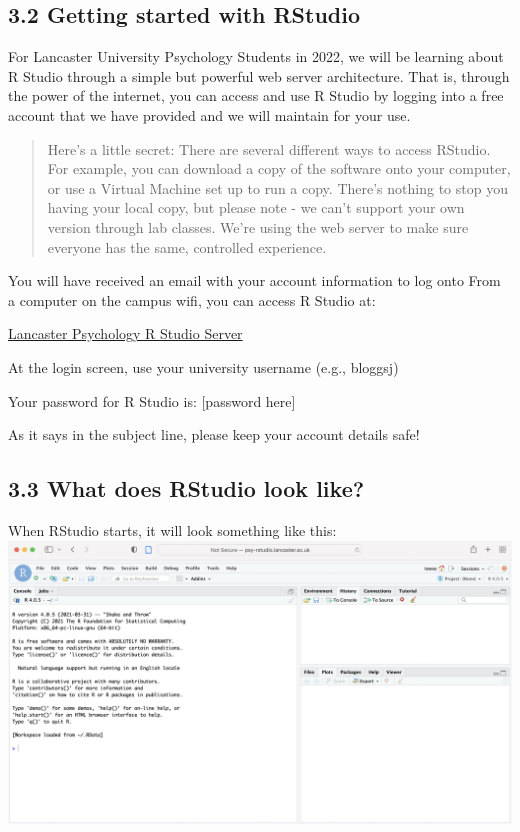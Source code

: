 \documentclass[
]{book}
\begin{document}
\hypertarget{getting_started}{%
\subsection{3.2 Getting started with RStudio}\label{getting_started}}

For Lancaster University Psychology Students in 2022, we will be learning about R Studio through a simple but powerful web server architecture. That is, through the power of the internet, you can access and use R Studio by logging into a free account that we have provided and we will maintain for your use.

\begin{quote}
Here's a little secret: There are several different ways to access RStudio. For example, you can download a copy of the software onto your computer, or use a Virtual Machine set up to run a copy. There's nothing to stop you having your local copy, but please note - we can't support your own version through lab classes. We're using the web server to make sure everyone has the same, controlled experience.
\end{quote}

You will have received an email with your account information to log onto From a computer on the campus wifi, you can access R Studio at:

\href{http://psy-rstudio.lancaster.ac.uk}{Lancaster Psychology R Studio Server}

At the login screen, use your university username (e.g., bloggsj)

Your password for R Studio is: {[}password here{]}

As it says in the subject line, please keep your account details safe!

\hypertarget{what-does-rstudio-look-like}{%
\subsection{3.3 What does RStudio look like?}\label{what-does-rstudio-look-like}}

When RStudio starts, it will look something like this: \includegraphics{docs/files/Week_1/RStudio_starup_screen.png}
\end{document}
